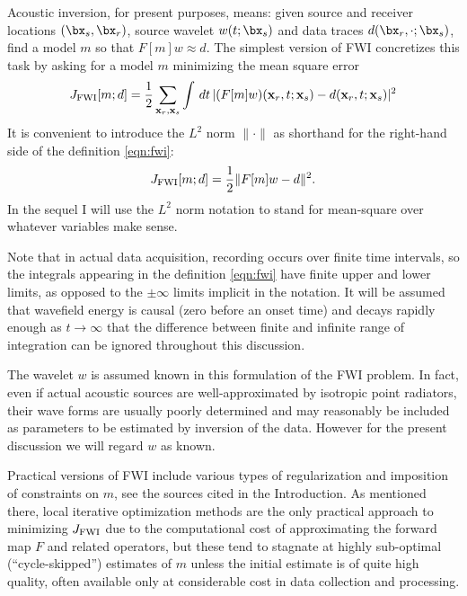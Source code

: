 Acoustic inversion, for present purposes, means: given source and receiver locations $(\bx_s,\bx_r)$, source wavelet
$w(t;\bx_s)$ and data traces $d(\bx_r,\cdot;\bx_s)$, find a model $m$
so that $F[m]w \approx d$. The
simplest version of FWI concretizes this task by asking for a model
$m$ minimizing the mean square error
\begin{equation}
  \label{eqn:fwi}
  J_{\rm FWI}[m;d] =\frac{1}{2} \sum_{{\bf x}_r,{\bf x}_s} \int\,dt\, |(F[m]w)({\bf x}_r,t;{\bf x}_s) - d({\bf x}_r,t;{\bf x}_s)|^2
\end{equation}
It is convenient to introduce the $L^2$ norm $\| \cdot \|$ as
shorthand for the right-hand side of the definition \ref{eqn:fwi}:
\[
  J_{\rm FWI}[m;d]= \frac{1}{2}\|F[m]w-d\|^2.
\]
In the sequel I will use the $L^2$ norm notation to stand for
mean-square over whatever variables make sense.

Note that in actual data acquisition, recording occurs over finite
time intervals, so the integrals appearing in the definition
\ref{eqn:fwi} have finite upper and lower limits, as opposed to the
$\pm \infty$ limits implicit in the notation. It will be assumed that
wavefield energy is causal (zero before an onset time) and decays
rapidly enough as $t \rightarrow \infty$ that the difference between
finite and infinite range of integration can be ignored throughout
this discussion.

The wavelet $w$ is assumed known in this formulation of the
FWI problem. In fact, even if actual acoustic sources are
well-approximated by isotropic point radiators, their wave forms are
usually poorly determined and may reasonably be
included as  parameters to be estimated by inversion of the
data. However for the present discussion we will regard $w$ as known.

Practical versions of FWI include various types of regularization and
imposition of constraints on $m$, see the sources cited in the
Introduction. As mentioned there, local iterative optimization methods
are the only practical approach to minimizing $J_{\rm FWI}$ due to the
computational cost of approximating the forward map $F$ and related
operators, but these tend to stagnate at highly sub-optimal
(``cycle-skipped'') estimates of $m$ unless the initial estimate is of
quite high quality, often available only at considerable cost in data
collection and processing.

